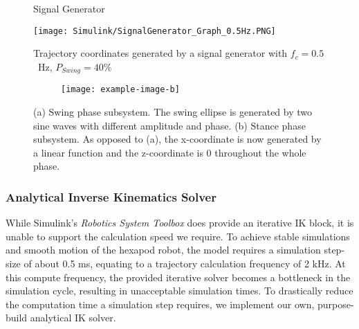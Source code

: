 
\begin{figure}[!h]
	\centerline{}
	\caption[Signal Generator]{Signal Generator}
	\label{figure: Signal Generator}
\end{figure}

\begin{figure}[!h]
	\centerline{\texttt{[image: Simulink/SignalGenerator\_Graph\_0.5Hz.PNG]}}
	\caption[2D Trajectory Coordinates]{Trajectory coordinates generated by a signal generator with $f_c=0.5$\ Hz, $P_{Swing}=40\text{\%}$}
	\label{figure: Trajectory graphs}
\end{figure}

\begin{figure}[!h]
	\centering
	\begin{subfigure}[b]{0.55\textwidth}
		
		\caption{}
		\label{fig:Ng1} 
	\end{subfigure}
	
	\begin{subfigure}[b]{0.55\textwidth}
	\texttt{[image: example-image-b]}
		\caption{}
		\label{fig:Ng2}
	\end{subfigure}
	
	\caption[Swing and Stance Phase]{(a) Swing phase subsystem. The swing ellipse is generated by two sine waves with different amplitude and phase. (b) Stance phase subsystem. As opposed to (a), the x-coordinate is now generated by a linear function and the z-coordinate is 0 throughout the whole phase.}
\end{figure}


\subsubsection{Analytical Inverse Kinematics Solver} \label{subsubsec: IK Solver}
While Simulink's \textit{Robotics System Toolbox} does provide an iterative IK block, it is unable to support the calculation speed we require.
To achieve stable simulations and smooth motion of the hexapod robot, the model requires a simulation step-size of about 0.5 ms, equating to a trajectory calculation frequency of 2 kHz.
At this compute frequency, the provided iterative solver becomes a bottleneck in the simulation cycle, resulting in unacceptable simulation times.
To drastically reduce the computation time a simulation step requires, we implement our own, purpose-build analytical IK solver.

